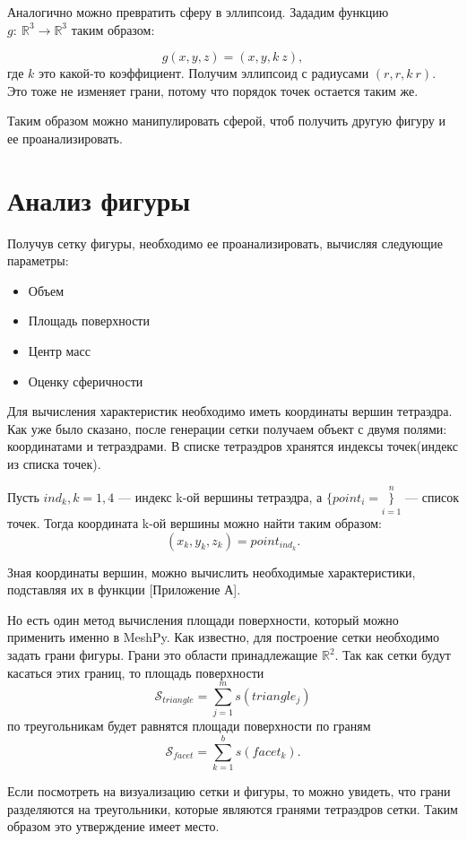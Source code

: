 Аналогично можно превратить сферу в эллипсоид. Зададим функцию\\
$g:~\mathbb{R}^{3} \rightarrow \mathbb{R}^{3}$ таким образом:

\noindent
$$g(x,y,z) = (x,y,k~z),$$
где $k$ это какой-то коэффициент. Получим эллипсоид с радиусами $(r,r,k~r)$.
Это тоже не изменяет грани, потому что порядок точек остается таким же. 

Таким образом можно манипулировать сферой, чтоб получить другую фигуру и ее проанализировать. 

\section{Анализ фигуры}
Получув сетку фигуры, необходимо ее проанализировать, вычисляя следующие параметры:
\begin{itemize}
    \item Объем
    \item Площадь поверхности
    \item Центр масс
    \item Оценку сферичности
\end{itemize}

Для вычисления характеристик необходимо иметь координаты вершин тетраэдра. Как уже было сказано, после генерации сетки получаем объект с двумя полями: координатами и тетраэдрами. В списке тетраэдров хранятся индексы точек(индекс из списка точек). 

Пусть $ind_{k}, k = {1,4}$ --- индекс k-ой вершины тетраэдра, а $\{point_{i}= \}\limits_{i = 1}^{n}$ --- список точек. Тогда координата k-ой вершины можно найти таким образом:
$$ (x_{k},y_{k},z_{k}) = point_{ind_{k}}.$$

Зная координаты вершин, можно вычислить необходимые характеристики, подставляя их в функции [Приложение А].  

Но есть один метод вычисления площади поверхности, который можно применить именно в MeshPy. Как известно, для построение сетки необходимо задать грани фигуры. Грани это области принадлежащие $\mathbb{R}^{2}$. Так как сетки будут касаться этих границ, то площадь поверхности 
$$\mathscr{S}_{triangle} =\sum\limits_{j = 1}^{m} s(triangle_{j})$$
по треугольникам будет равнятся площади поверхности по граням
$$\mathscr{S}_{facet} =\sum\limits_{k = 1}^{b} s(facet_{k}).$$

Если посмотреть на визуализацию сетки и фигуры, то можно увидеть, что грани разделяются на треугольники, которые являются гранями тетраэдров сетки. Таким образом это утверждение имеет место. 


